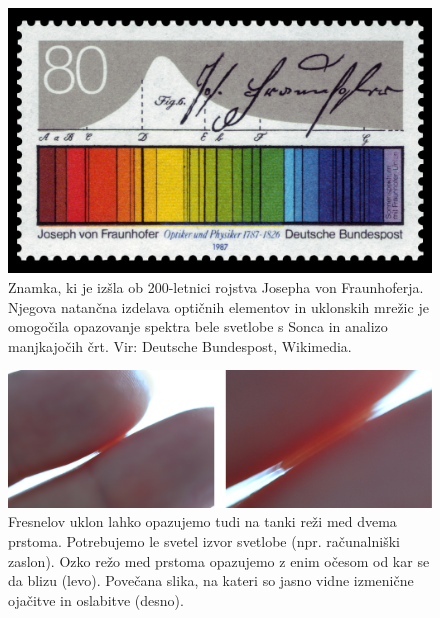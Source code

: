 \begin{figure}[ht]
\centering
\includegraphics[width=90truemm]{slike/05_Znamka.jpg}
\caption{Znamka, ki je izšla ob 200-letnici rojstva Josepha von Fraunhoferja. Njegova natančna
izdelava optičnih elementov in uklonskih mrežic je omogočila opazovanje spektra bele svetlobe 
s Sonca in analizo manjkajočih črt. Vir: Deutsche Bundespost, Wikimedia.}
\label{fig:05_znamka}
\end{figure}

\begin{figure}[ht]
\centering
\includegraphics[width=140truemm]{slike/05_Prsti.jpg}
\caption{Fresnelov uklon lahko opazujemo tudi na tanki reži med dvema prstoma. Potrebujemo
le svetel izvor svetlobe (npr. računalniški zaslon). Ozko režo med prstoma opazujemo z enim očesom od
kar se da blizu (levo). Povečana slika, na kateri so jasno vidne izmenične ojačitve in oslabitve (desno).}
\label{fig:05_prsti}
\vspace*{7truecm}
\end{figure}

